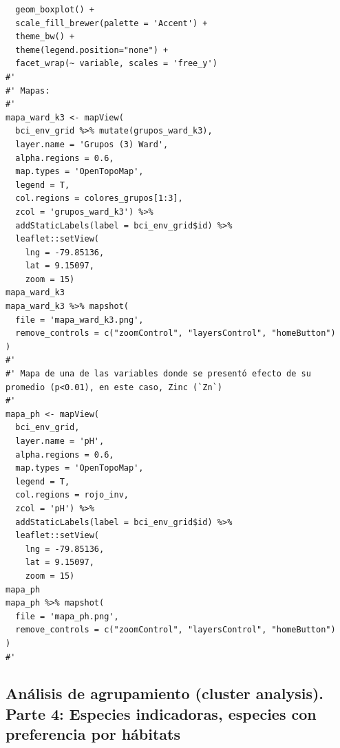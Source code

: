 \documentclass[11pt,]{article}
\begin{document}
\begin{verbatim}
  geom_boxplot() + 
  scale_fill_brewer(palette = 'Accent') +
  theme_bw() +
  theme(legend.position="none") +
  facet_wrap(~ variable, scales = 'free_y')
#' 
#' Mapas:
#' 
mapa_ward_k3 <- mapView(
  bci_env_grid %>% mutate(grupos_ward_k3),
  layer.name = 'Grupos (3) Ward',
  alpha.regions = 0.6,
  map.types = 'OpenTopoMap',
  legend = T,
  col.regions = colores_grupos[1:3],
  zcol = 'grupos_ward_k3') %>%
  addStaticLabels(label = bci_env_grid$id) %>% 
  leaflet::setView(
    lng = -79.85136,
    lat = 9.15097,
    zoom = 15)
mapa_ward_k3
mapa_ward_k3 %>% mapshot(
  file = 'mapa_ward_k3.png', 
  remove_controls = c("zoomControl", "layersControl", "homeButton")
)
#' 
#' Mapa de una de las variables donde se presentó efecto de su promedio (p<0.01), en este caso, Zinc (`Zn`)
#' 
mapa_ph <- mapView(
  bci_env_grid,
  layer.name = 'pH',
  alpha.regions = 0.6,
  map.types = 'OpenTopoMap',
  legend = T,
  col.regions = rojo_inv,
  zcol = 'pH') %>%
  addStaticLabels(label = bci_env_grid$id) %>% 
  leaflet::setView(
    lng = -79.85136,
    lat = 9.15097,
    zoom = 15)
mapa_ph
mapa_ph %>% mapshot(
  file = 'mapa_ph.png', 
  remove_controls = c("zoomControl", "layersControl", "homeButton")
)
#' 
\end{verbatim}

\subsection{Análisis de agrupamiento (cluster analysis). Parte 4:
Especies indicadoras, especies con preferencia por
hábitats}\label{anuxe1lisis-de-agrupamiento-cluster-analysis.-parte-4-especies-indicadoras-especies-con-preferencia-por-huxe1bitats}
\end{document}
